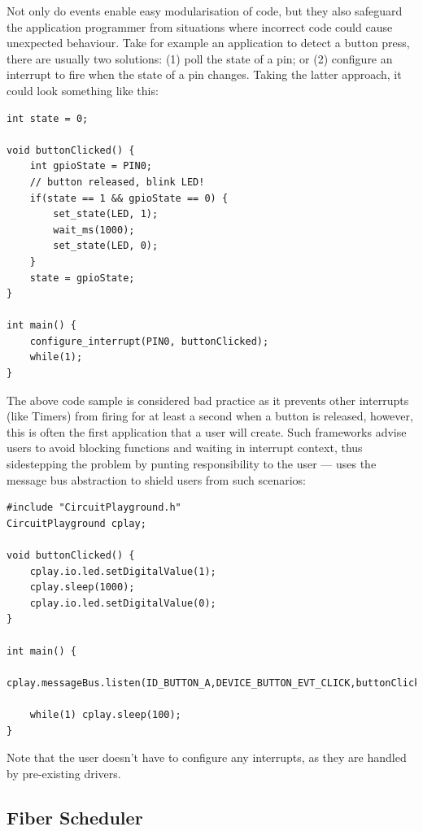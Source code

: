 Not only do events enable easy modularisation of code, but they also safeguard the application programmer from situations where incorrect code could cause unexpected behaviour. Take for example an application to detect a button press, there are usually two solutions: (1) poll the state of a pin; or (2) configure an interrupt to fire when the state of a pin changes. Taking the latter approach, it could look something like this:

\begin{lstlisting}
int state = 0;

void buttonClicked() {
    int gpioState = PIN0;
    // button released, blink LED!
    if(state == 1 && gpioState == 0) {
        set_state(LED, 1);
        wait_ms(1000);
        set_state(LED, 0);
    }
    state = gpioState;
}

int main() {
    configure_interrupt(PIN0, buttonClicked);
    while(1);
}
\end{lstlisting}

The above code sample is considered bad practice as it prevents other interrupts (like Timers) from firing for at least a second when a button is released, however, this is often the first application that a user will create. Such frameworks advise users to avoid blocking functions and waiting in interrupt context, thus sidestepping the problem by punting responsibility to the user --- \CO uses the message bus abstraction to shield users from such scenarios:

\begin{lstlisting}
#include "CircuitPlayground.h"
CircuitPlayground cplay;

void buttonClicked() {
    cplay.io.led.setDigitalValue(1);
    cplay.sleep(1000);
    cplay.io.led.setDigitalValue(0);
}

int main() {
    cplay.messageBus.listen(ID_BUTTON_A,DEVICE_BUTTON_EVT_CLICK,buttonClicked);

    while(1) cplay.sleep(100);
}
\end{lstlisting}

Note that the user doesn't have to configure any interrupts, as they are handled by pre-existing drivers.


\subsection{Fiber Scheduler}

